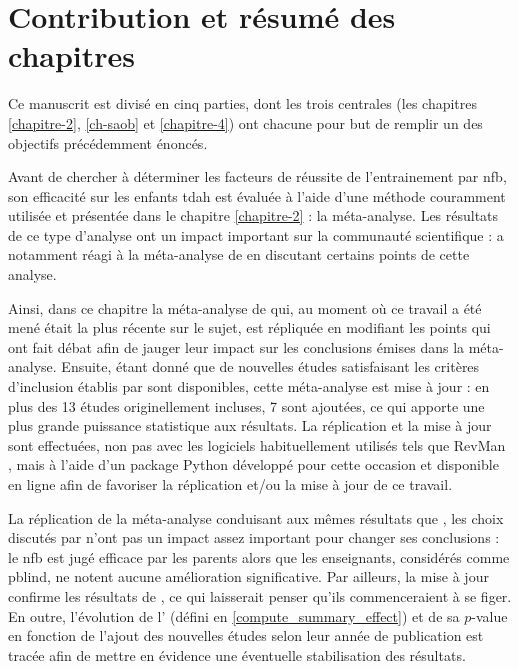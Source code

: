 \section{Contribution et résumé des chapitres}

Ce manuscrit est divisé en cinq parties, dont les trois centrales (les chapitres \ref{chapitre-2}, \ref{ch-saob} et \ref{chapitre-4}) 
ont chacune pour but de remplir un des objectifs précédemment énoncés.

Avant de chercher à déterminer les facteurs de réussite de l'entrainement par \gls{nfb}, son efficacité sur les enfants \gls{tdah} est évaluée à l'aide 
d'une méthode couramment utilisée \citep{Sonuga-Barke2013, Micoulaud2014, Cortese2016} et présentée dans le chapitre \ref{chapitre-2} : la méta-analyse. 
Les résultats de ce type d'analyse ont un impact important sur la communauté scientifique : \citet{Micoulaud2016} a notamment réagi à la méta-analyse de 
\citet{Cortese2016} en discutant certains points de cette analyse. 

Ainsi, dans ce chapitre la méta-analyse de \citet{Cortese2016} qui, au moment où ce travail a été mené était la plus récente sur le sujet, 
est répliquée en modifiant les points qui ont fait débat \citep{Micoulaud2016} afin de jauger leur impact sur les conclusions émises dans la méta-analyse. 
Ensuite, étant donné que de nouvelles études satisfaisant les critères d'inclusion établis par \citet{Cortese2016} sont disponibles, cette méta-analyse 
est mise à jour : en plus des 13 études originellement incluses, 7 sont ajoutées, ce qui apporte une plus grande puissance statistique aux résultats. 
La réplication et la mise à jour sont effectuées, non pas avec les logiciels 
habituellement utilisés tels que RevMan \citep{Revman}, mais à l'aide d'un package Python développé pour cette occasion et disponible en ligne afin de favoriser 
la réplication et/ou la mise à jour de ce travail. 

La réplication de la méta-analyse conduisant aux mêmes résultats que \citet{Cortese2016}, les choix discutés par \citet{Micoulaud2016} n'ont pas un impact assez
important pour changer ses conclusions : le \gls{nfb} est jugé efficace par les parents alors que les enseignants, considérés comme \gls{pblind}, ne notent aucune
amélioration significative. Par ailleurs, la mise à jour confirme les résultats de \citet{Cortese2016}, ce qui laisserait penser qu'ils commenceraient
à se figer. En outre, l'évolution de l' (défini en \ref{compute_summary_effect}) et de sa $p$-value en fonction de l'ajout des nouvelles études selon
leur année de publication est tracée afin de mettre en évidence une éventuelle stabilisation des résultats. 

